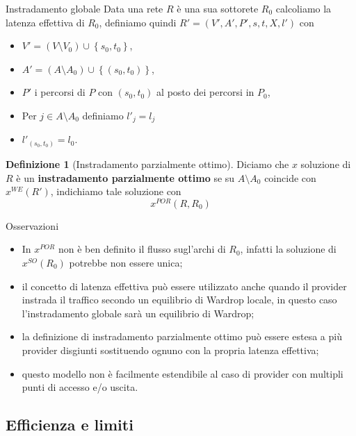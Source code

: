 \documentclass{beamer}
\newcounter{counter1}
\theoremstyle{plain}
\theoremstyle{definition}
\newtheorem{mydef}[counter1]{Definizione}
\theoremstyle{remark}
\newcommand{\set}[1]{\left\{#1\right\}}
\newcommand{\pa}[1]{\left(#1\right)}
\begin{document}
\begin{frame}{Instradamento globale}
  Data una rete $R$ è una sua sottorete $R_0$ calcoliamo la latenza
  effettiva di $R_0$, definiamo quindi $R'=(V',A',P',s,t,X,l')$ con
  \begin{itemize}
  \item $V' = \pa{V\setminus V_0}\cup \set{s_0,t_0}$,
  \item $A' = \pa{A\setminus A_0}\cup \set{\pa{s_0,t_0}}$,
  \item $P'$ i percorsi di $P$ con $\pa{s_0,t_0}$ al posto dei
    percorsi in $P_0$,
  \item Per $j\in A\setminus A_0$ definiamo $l'_j = l_j$
  \item $l'_{\pa{s_0,t_0}} = l_0$.
  \end{itemize}

  \begin{mydef}[Instradamento parzialmente ottimo]
    Diciamo che $x$ soluzione di $R$ è un \textbf{instradamento
      parzialmente ottimo} se su $A\setminus A_0$ coincide con
    $x^{WE}(R')$, indichiamo tale soluzione con
    \[ x^{POR}(R,R_0) \]
  \end{mydef}
\end{frame}

\begin{frame}{Osservazioni}
  \begin{itemize}
  \item In $x^{POR}$ non è ben definito il flusso sugl'archi di $R_0$,
    infatti la soluzione di $x^{SO}(R_0)$ potrebbe non essere unica;
  \item il concetto di latenza effettiva può essere utilizzato anche
    quando il provider instrada il traffico secondo un equilibrio di
    Wardrop locale, in questo caso l'instradamento globale sarà un
    equilibrio di Wardrop;
  \item la definizione di instradamento parzialmente ottimo può essere
    estesa a più provider disgiunti sostituendo ognuno con la propria
    latenza effettiva;
  \item questo modello non è facilmente estendibile al caso di
    provider con multipli punti di accesso e/o uscita.
  \end{itemize}
\end{frame}

\subsection{Efficienza e limiti}
\end{document}
